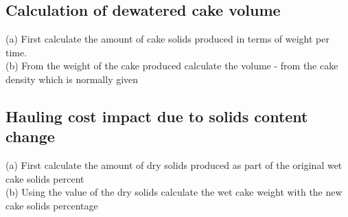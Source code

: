 \subsection{Calculation of dewatered cake volume}

(a) First calculate the amount of cake solids produced in terms of weight per time.\\
(b) From the weight of the cake produced calculate the volume - from the cake density which is
normally given\\

\subsection{Hauling cost impact due to solids content change}

(a) First calculate the amount of dry solids produced as part of the original wet cake solids percent\\
(b) Using the value of the dry solids calculate the wet cake weight with the new cake solids percentage\\

